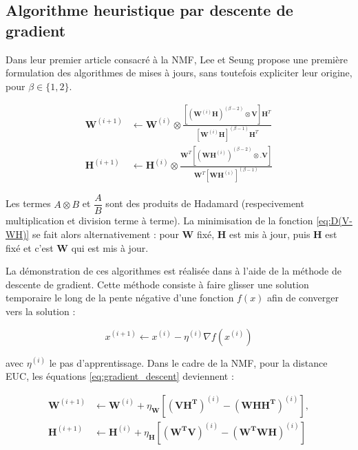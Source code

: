 \subsection{Algorithme heuristique par descente de gradient}

Dans leur premier article consacré à la NMF, Lee et Seung \cite{lee_learning_1999} propose une première formulation des algorithmes de mises à jours, sans toutefois expliciter leur origine,  pour $\beta  \in \lbrace 1,2 \rbrace$.

\begin{subequations}\label{eq:WHupdateGD}
\begin{align}
\textbf{W}^{(i+1)} &\leftarrow \textbf{W}^{(i)}\otimes\frac{\left[\left(\textbf{W}^{(i)}\mathbf{H} \right)^{(\beta-2)}\otimes\textbf{V} \right]\textbf{H}^T}{\left[\textbf{W}^{(i)}\mathbf{H} \right]^{(\beta-1)}\textbf{H}^T}\\
\textbf{H}^{(i+1)} &\leftarrow \textbf{H}^{(i)}\otimes\frac{\textbf{W}^T \left[\left(\textbf{WH}^{(i)} \right)^{(\beta-2)}\otimes.\textbf{V} \right]}{\textbf{W}^T \left[\textbf{WH}^{(i)} \right]^{(\beta-1)}}
\end{align}
\end{subequations}

Les termes $A\otimes B$ et $\dfrac{A}{B}$ sont des produits de Hadamard (respecivement multiplication et division terme à terme). La minimisation de la fonction \ref{eq:D(V-WH)} se fait alors alternativement : pour $\mathbf{W}$ fixé, $\mathbf{H}$ est mis à jour, puis $\mathbf{H}$ est fixé et c'est $\mathbf{W}$ qui est mis à jour.

La démonstration de ces algorithmes est réalisée dans \cite{lee_algorithms_2000} à l'aide de la méthode de descente de gradient. Cette méthode consiste à faire \og glisser \fg {} une solution temporaire le long de la pente négative d'une fonction $f(x)$ afin de converger vers la solution \cite{kivinen_exponentiated_1994} : 

\begin{equation}\label{eq:gradient_descent}
x^{(i+1)} \leftarrow x^{(i)} - \eta^{(i)} \nabla f(x^{(i)})
\end{equation} 

avec $\eta^{(i)}$ le pas d'apprentissage. Dans le cadre de la NMF, pour la distance EUC, les équations \ref{eq:gradient_descent} deviennent : 

\begin{subequations}\label{eq:WHgradientDescente}
    \begin{align}
     \mathbf{W}^{(i+1)} & \leftarrow \mathbf{W}^{(i)}+\eta_{\mathbf{W}}\left[ \left(\mathbf{V H^T}\right)^{(i)} - \left(\mathbf{W H H^T}\right)^{(i)} \right ], \\
      \mathbf{H}^{(i+1)} & \leftarrow \mathbf{H}^{(i)}+\eta_{\mathbf{H}}\left[ \left(\mathbf{W^TV}\right)^{(i)}-\left(\mathbf{W^T W H} \right)^{(i)}\right ]      
    \end{align}
\end{subequations}

